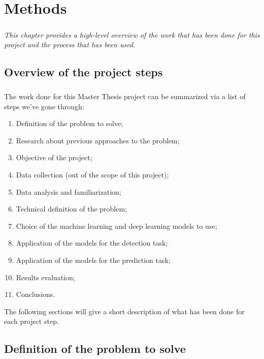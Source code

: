 
\chapter{Methods} \label{chap: methods}

\paragraph{} \textit{This chapter provides a high-level overview of the work that has been done for this project and the process that has been used.}

\section{Overview of the project steps}
\paragraph{} The work done for this Master Thesis project can be summarized via a list of steps we've gone through:
\begin{enumerate}
    \item Definition of the problem to solve;
    \item Research about previous approaches to the problem;
    \item Objective of the project;
    \item Data collection (out of the scope of this project);
    \item Data analysis and familiarization;
    \item Technical definition of the problem;
    \item Choice of the machine learning and deep learning models to use;
    \item Application of the models for the detection task;
    \item Application of the models for the prediction task;
    \item Results evaluation;
    \item Conclusions.
\end{enumerate}
The following sections will give a short description of what has been done for each project step.

\section{Definition of the problem to solve}
